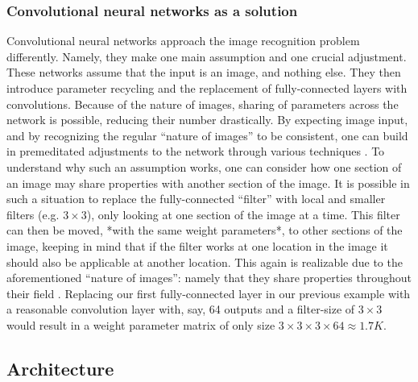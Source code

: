 \subsubsection{Convolutional neural networks as a solution}
Convolutional neural networks approach the image recognition problem differently. Namely, they make one main assumption and one crucial adjustment. These networks assume that the input is an image, and nothing else. They then introduce parameter recycling and the replacement of fully-connected layers with convolutions. Because of the nature of images, sharing of parameters across the network is possible, reducing their number drastically. By expecting image input, and by recognizing the regular ``nature of images'' to be consistent, one can build in premeditated adjustments to the network through various techniques \cite{convnets}. To understand why such an assumption works, one can consider how one section of an image may share properties with another section of the image. It is possible in such a situation to replace the fully-connected ``filter'' with local and smaller filters (e.g. $3\times3$), only looking at one section of the image at a time. This filter can then be moved, *with the same weight parameters*, to other sections of the image, keeping in mind that if the filter works at one location in the image it should also be applicable at another location. This again is realizable due to the aforementioned ``nature of images'': namely that they share properties throughout their field \cite{convnets}. Replacing our first fully-connected layer in our previous example with a reasonable convolution layer with, say, 64 outputs and a filter-size of $3\times3$ would result in a weight parameter matrix of only size $3\times3\times3\times64 \approx 1.7K$.


\subsection{Architecture}
